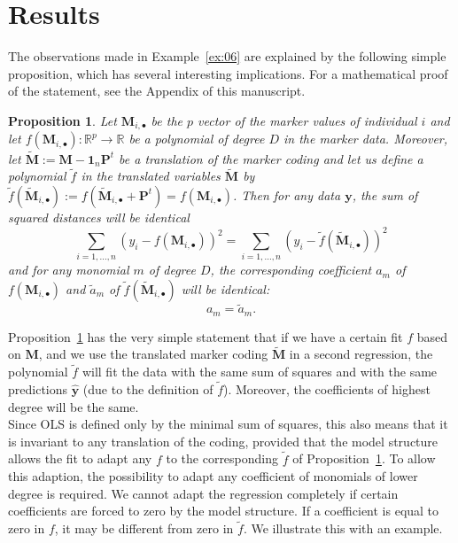 \documentclass{bmcart}
\newtheorem{proposition}{Proposition}
\newcommand{\M}{\mathbf{M}}
\newcommand{\0}{\mathbf{0}}
\newcommand{\y}{\mathbf{y}}
\renewcommand{\P}{\mathbf{P}}
\begin{document}
\section*{Results} 
The observations made in Example~\ref{ex:06} are explained by the following simple proposition,
which has several interesting implications. 
For a mathematical proof of the statement, see the Appendix of this manuscript.
\begin{proposition}\label{prop:01} Let $\M_{i,\bullet}$ be the $p$ vector of the marker values of individual $i$ and let $f(\M_{i,\bullet}): \mathbb{R}^p \rightarrow \mathbb{R}$ be a polynomial of degree $D$ in the marker data. Moreover, let $\tilde{\M}:= \M - \mathbf{1}_n \P^t$ be a translation of the marker coding and let us define a polynomial $\tilde{f}$ in the translated variables $\tilde{\M}$ by $\tilde{f}(\tilde{\M}_{i,\bullet}):= f(\tilde{\M}_{i,\bullet} +  \P^t)=f(\M_{i,\bullet})$. Then for any data $\y$, the sum of squared distances will be identical 
	$$ \sum_{i=1,...,n} (y_i - f(\M_{i,\bullet}))^2 = \sum_{i=1,...,n} (y_i - \tilde{f}(\tilde{\M}_{i,\bullet}))^2 $$
	and for any monomial $m$ of degree $D$, the corresponding coefficient $a_m$ of $f(\M_{i,\bullet})$ and $\tilde{a}_m$ of $\tilde{f}(\tilde{\M}_{i,\bullet})$ will be identical:
	$$a_m = \tilde{a}_m.$$ 
\end{proposition}

Proposition~\ref{prop:01} has the very simple statement that if we have a certain fit $f$ based on $\M$, and we use the translated marker coding $\tilde{\M}$ in a second regression, the polynomial $\tilde{f}$ will fit the data with the same sum of squares and with the same predictions $\hat{\y}$ (due to the definition of $\tilde{f}$). Moreover, the coefficients of highest degree will be the same.  \\

Since OLS is defined only by the minimal sum of squares, this also means that it is invariant to any translation of the coding, provided that the model structure allows the fit to 
adapt any $f$ to the corresponding $\tilde{f}$ of Proposition~\ref{prop:01}.
To allow this adaption, the possibility to adapt any coefficient of monomials of lower degree is required.
We cannot adapt the regression completely if certain coefficients are forced to zero by the model structure. If a coefficient is equal to zero in $f$, it may be different from zero in $\tilde{f}$.
We illustrate this with an example. 
\end{document}
